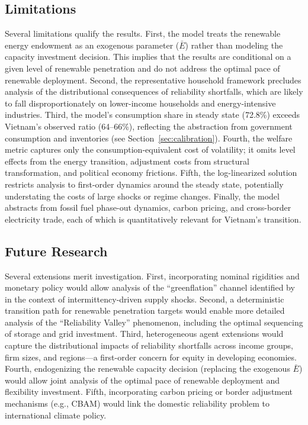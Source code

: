 \documentclass[12pt, a4paper]{article}
\begin{document}
\subsection*{Limitations}

Several limitations qualify the results. First, the model treats the renewable energy endowment as an exogenous parameter ($\bar{E}$) rather than modeling the capacity investment decision. This implies that the results are conditional on a given level of renewable penetration and do not address the optimal pace of renewable deployment. Second, the representative household framework precludes analysis of the distributional consequences of reliability shortfalls, which are likely to fall disproportionately on lower-income households and energy-intensive industries. Third, the model's consumption share in steady state (72.8\%) exceeds Vietnam's observed ratio (64--66\%), reflecting the abstraction from government consumption and inventories (see Section~\ref{sec:calibration}). Fourth, the welfare metric captures only the consumption-equivalent cost of volatility; it omits level effects from the energy transition, adjustment costs from structural transformation, and political economy frictions. Fifth, the log-linearized solution restricts analysis to first-order dynamics around the steady state, potentially understating the costs of large shocks or regime changes. Finally, the model abstracts from fossil fuel phase-out dynamics, carbon pricing, and cross-border electricity trade, each of which is quantitatively relevant for Vietnam's transition.

\subsection*{Future Research}

Several extensions merit investigation. First, incorporating nominal rigidities and monetary policy would allow analysis of the ``greenflation'' channel identified by \citet{airaudo2025green} in the context of intermittency-driven supply shocks. Second, a deterministic transition path for renewable penetration targets would enable more detailed analysis of the ``Reliability Valley'' phenomenon, including the optimal sequencing of storage and grid investment. Third, heterogeneous agent extensions would capture the distributional impacts of reliability shortfalls across income groups, firm sizes, and regions---a first-order concern for equity in developing economies. Fourth, endogenizing the renewable capacity decision (replacing the exogenous $\bar{E}$) would allow joint analysis of the optimal pace of renewable deployment and flexibility investment. Fifth, incorporating carbon pricing or border adjustment mechanisms (e.g., CBAM) would link the domestic reliability problem to international climate policy.
\end{document}
